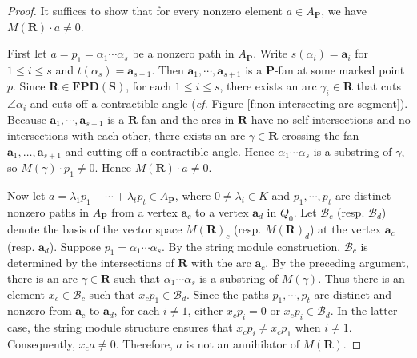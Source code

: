 \documentclass[a4paper,10pt]{amsart}
\theoremstyle{plain}          %
\theoremstyle{definition}
\def\SS{\mathbf{S}}
\def\RR{\mathbf{R}}
\def\af{\mathbf{a}}
\def\PP{\mathbf{P}}
\newcommand{\FPD}{\mathbf{FPD}}
\begin{document}
\begin{proof}

	It suffices to show that for every nonzero element $a\in A_{\PP}$, we have $M(\mathbf{R})\cdot a\ne 0$.
	
	First let $a=p_1=\alpha_1\cdots\alpha_s$ be a nonzero path in $A_\PP$.
	Write $s(\alpha_i)=\af_i$ for $1\leq i\leq s$  and $t(\alpha_s)=\af_{s+1}$. Then $\af_1,\cdots,\af_{s+1}$ is a $\PP$-fan at some marked point $p$.  Since $\mathbf{R}\in\FPD(\SS)$,  for each $1\leq i\leq s$, there exists an arc $\gamma_i\in\mathbf{R}$ that cuts $\angle\alpha_i$ and cuts off a contractible angle ({\em cf.} Figure \ref{f:non intersecting arc segment}). Because $\af_1,\cdots,\af_{s+1}$ is a $\RR$-fan and the arcs in $\mathbf{R}$ have no self-intersections and no intersections with each other, there exists an arc $\gamma\in\mathbf{R}$ crossing the fan $\af_1,\ldots,\af_{s+1}$ and cutting off a contractible angle.  Hence $\alpha_1\cdots\alpha_s$ is a substring of $\gamma$, so
	$M(\gamma)\cdot p_1\neq 0$. Hence $M(\mathbf{R})\cdot a\neq0$.
	
	Now let $a=\lambda_1p_1+\cdots+\lambda_tp_t\in A_{\PP}$, where $0\neq \lambda_i\in K$ and $p_1,\cdots,p_t$ are distinct nonzero paths in $A_{\PP}$ from a vertex $\af_c$ to a vertex $\af_d$ in $Q_0$.
	Let $\mathcal{B}_c$ (resp. $\mathcal{B}_d$) denote the basis of the vector space $M(\mathbf{R})_c$ (resp. $M(\mathbf{R})_d$) at the vertex $\af_c$ (resp. $\af_d$). Suppose $p_1=\alpha_1\cdots\alpha_s$. By the string module construction, $\mathcal{B}_c$ is determined by the intersections of $\RR$ with the arc $\af_c$.  By the preceding argument, there is an arc $\gamma\in\mathbf{R}$ such that $\alpha_1\cdots\alpha_s$ is a substring of $M(\gamma)$. Thus there is an element $x_c\in \mathcal{B}_c$ such that $x_cp_1\in \mathcal{B}_d$. Since the paths $p_1,\cdots,p_t$ are distinct and nonzero from  $\af_c$ to $\af_d$, for each $i\neq 1$, either $x_cp_i=0$ or $x_cp_i\in \mathcal{B}_d$. In the latter case, the string module structure ensures that $x_cp_i\neq x_cp_1$ when $i\neq 1$. Consequently, $x_ca\neq 0$. Therefore, $a$ is not an annihilator of $M(\mathbf{R})$.
\end{proof}
\end{document}
